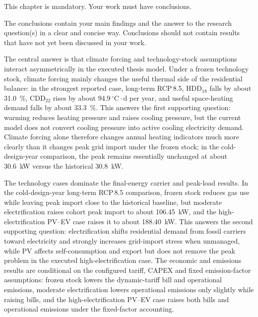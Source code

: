 \label{ch:conclusions}

\begin{explanation}
    This chapter is mandatory. Your work must have conclusions.
    
    The conclusions contain your main findings and the answer to the research question(s) in a clear and concise way. Conclusions should not contain results that have not yet been discussed in your work.
\end{explanation}

The central answer is that climate forcing and technology-stock assumptions interact asymmetrically in the executed thesis model. Under a frozen technology stock, climate forcing mainly changes the useful thermal side of the residential balance: in the strongest reported case, long-term RCP\,8.5, HDD$_{18}$ falls by about \SI{31.0}{\percent}, CDD$_{22}$ rises by about $94.9\,^{\circ}\mathrm{C}\cdot\mathrm{d}$ per year, and useful space-heating demand falls by about \SI{33.3}{\percent}. This answers the first supporting question: warming reduces heating pressure and raises cooling pressure, but the current model does not convert cooling pressure into active cooling electricity demand. Climate forcing alone therefore changes annual heating indicators much more clearly than it changes peak grid import under the frozen stock; in the cold-design-year comparison, the peak remains essentially unchanged at about \SI{30.6}{kW} versus the historical \SI{30.8}{kW}.

The technology cases dominate the final-energy carrier and peak-load results. In the cold-design-year long-term RCP\,8.5 comparison, frozen stock reduces gas use while leaving peak import close to the historical baseline, but moderate electrification raises cohort peak import to about \SI{106.45}{kW}, and the high-electrification PV--EV case raises it to about \SI{188.40}{kW}. This answers the second supporting question: electrification shifts residential demand from fossil carriers toward electricity and strongly increases grid-import stress when unmanaged, while PV affects self-consumption and export but does not remove the peak problem in the executed high-electrification case. The economic and emissions results are conditional on the configured tariff, CAPEX and fixed emission-factor assumptions: frozen stock lowers the dynamic-tariff bill and operational emissions, moderate electrification lowers operational emissions only slightly while raising bills, and the high-electrification PV--EV case raises both bills and operational emissions under the fixed-factor accounting.

